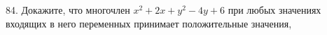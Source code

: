 84. Докажите, что многочлен $x^2+2x+y^2-4y+6$ при любых значениях входящих в него переменных принимает положительные значения,\\
